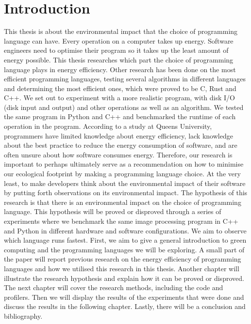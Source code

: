 \chapter{Introduction}
This thesis is about the environmental impact that the choice of programming language can have. Every operation on a computer takes up energy. Software engineers need to optimise their program so it takes up the least amount of energy possible. This thesis researches which part the choice of programming language plays in energy efficiency.
Other research has been done on the most efficient programming languages, testing several algorithms in different languages and determining the most efficient ones, which were proved to be C, Rust and C++. We set out to experiment with a more realistic program, with disk I/O (disk input and output) and other operations as well as an algorithm. We tested the same program in Python and C++ and benchmarked the runtime of each operation in the program.
According to a study at Queens University, programmers have limited knowledge about energy efficiency, lack knowledge about the best practice to reduce the energy consumption of software, and are often unsure about how software consumes energy.
Therefore, our research is important to perhaps ultimately serve as a recommendation on how to minimise our ecological footprint by making a programming language choice. At the very least, to make developers think about the environmental impact of their software by putting forth observations on its environmental impact.
The hypothesis of this research is that there is an environmental impact on the choice of programming language. This hypothesis will be proved or disproved through a series of experiments where we benchmark the same image processing program in C++ and Python in different hardware and software configurations. We aim to observe which language runs fastest.
First, we aim to give a general introduction to green computing and the programming languages we will be exploring. A small part of the paper will report previous research on the energy efficiency of programming languages and how we utilised this research in this thesis. Another chapter will illustrate the research hypothesis and explain how it can be proved or disproved. The next chapter will cover the research methods, including the code and profilers. Then we will display the results of the experiments that were done and discuss the results in the following chapter. Lastly, there will be a conclusion and bibliography.
